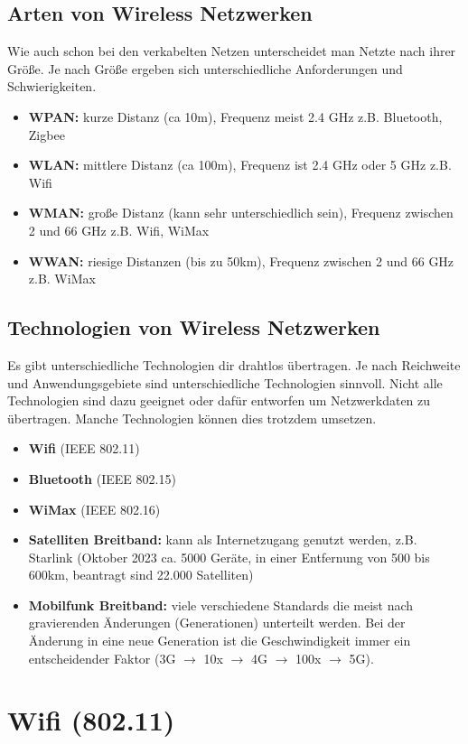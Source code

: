 \subsection*{Arten von Wireless Netzwerken}
Wie auch schon bei den verkabelten Netzen unterscheidet man Netzte nach ihrer Größe. Je nach Größe ergeben sich unterschiedliche Anforderungen und Schwierigkeiten.
\begin{itemize}
	\item \textbf{WPAN:} kurze Distanz (ca 10m), Frequenz meist 2.4 GHz z.B. Bluetooth, Zigbee
	\item \textbf{WLAN:} mittlere Distanz (ca 100m), Frequenz ist 2.4 GHz oder 5 GHz z.B. Wifi
	\item \textbf{WMAN:} große Distanz (kann sehr unterschiedlich sein), Frequenz zwischen 2 und 66 GHz z.B. Wifi, WiMax
	\item \textbf{WWAN:} riesige Distanzen (bis zu 50km), Frequenz zwischen 2 und 66 GHz z.B. WiMax
\end{itemize}

\subsection*{Technologien von Wireless Netzwerken}
Es gibt unterschiedliche Technologien dir drahtlos übertragen. Je nach Reichweite und Anwendungsgebiete sind unterschiedliche Technologien sinnvoll. Nicht alle Technologien sind dazu geeignet oder dafür entworfen um Netzwerkdaten zu übertragen. Manche Technologien können dies trotzdem umsetzen.
\begin{itemize}
	\item \textbf{Wifi} (IEEE 802.11)
	\item \textbf{Bluetooth} (IEEE 802.15)
	\item \textbf{WiMax} (IEEE 802.16)
	\item \textbf{Satelliten Breitband:} kann als Internetzugang genutzt werden, z.B. Starlink (Oktober 2023 ca. 5000 Geräte, in einer Entfernung von 500 bis 600km, beantragt sind 22.000 Satelliten)
	\item \textbf{Mobilfunk Breitband:} viele verschiedene Standards die meist nach gravierenden Änderungen (Generationen) unterteilt werden. Bei der Änderung in eine neue Generation ist die Geschwindigkeit immer ein entscheidender Faktor (3G $\rightarrow$ 10x $\rightarrow$ 4G $\rightarrow$ 100x $\rightarrow$ 5G).
\end{itemize}

\section{Wifi (802.11)}
